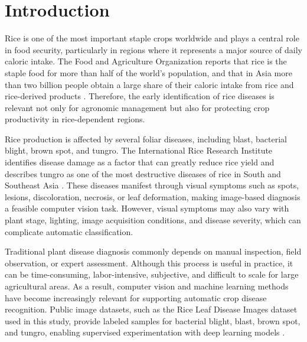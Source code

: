 \section{Introduction}

Rice is one of the most important staple crops worldwide and plays a central role in food security, particularly in regions where it represents a major source of daily caloric intake. The Food and Agriculture Organization reports that rice is the staple food for more than half of the world's population, and that in Asia more than two billion people obtain a large share of their caloric intake from rice and rice-derived products \cite{fao_rice_conference}. Therefore, the early identification of rice diseases is relevant not only for agronomic management but also for protecting crop productivity in rice-dependent regions.

Rice production is affected by several foliar diseases, including blast, bacterial blight, brown spot, and tungro. The International Rice Research Institute identifies disease damage as a factor that can greatly reduce rice yield and describes tungro as one of the most destructive diseases of rice in South and Southeast Asia \cite{irri_rice_diseases,irri_rice_disease_damage}. These diseases manifest through visual symptoms such as spots, lesions, discoloration, necrosis, or leaf deformation, making image-based diagnosis a feasible computer vision task. However, visual symptoms may also vary with plant stage, lighting, image acquisition conditions, and disease severity, which can complicate automatic classification.

Traditional plant disease diagnosis commonly depends on manual inspection, field observation, or expert assessment. Although this process is useful in practice, it can be time-consuming, labor-intensive, subjective, and difficult to scale for large agricultural areas. As a result, computer vision and machine learning methods have become increasingly relevant for supporting automatic crop disease recognition. Public image datasets, such as the Rice Leaf Disease Images dataset used in this study, provide labeled samples for bacterial blight, blast, brown spot, and tungro, enabling supervised experimentation with deep learning models \cite{kaggle_rice_leaf_disease}.

